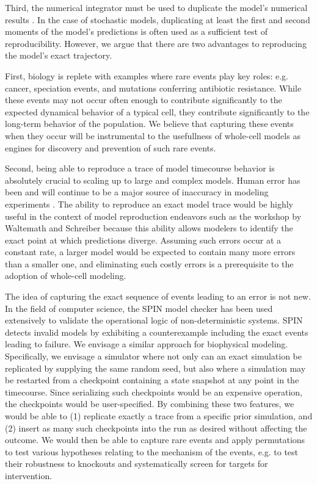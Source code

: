 \documentclass[journal,transmag,twoside]{IEEEtran}
\begin{document}
Third, the numerical integrator must be used to duplicate the model's numerical results \cite{easterbrook2014open}. In the case of stochastic models, duplicating at least the first and second moments of the model's predictions is often used as a sufficient test of reproducibility. However, we argue that there are two advantages to reproducing the model's exact trajectory.

First, biology is replete with examples where rare events play key roles: e.g. cancer, speciation events, and mutations conferring antibiotic resistance. While these events may not occur often enough to contribute significantly to the expected dynamical behavior of a typical cell, they contribute significantly to the long-term behavior of the population. We believe that capturing these events when they occur will be instrumental to the usefullness of whole-cell models as engines for discovery and prevention of such rare events.

Second, being able to reproduce a trace of model timecourse behavior is absolutely crucial to scaling up to large and complex models. Human error has been and will continue to be a major source of inaccuracy in modeling experiments \cite{ebrahim2015genome}. The ability to reproduce an exact model trace would be highly useful in the context of model reproduction endeavors such as the workshop by Waltemath and Schreiber because this ability allows modelers to identify the exact point at which predictions diverge. Assuming such errors occur at a constant rate, a larger model would be expected to contain many more errors than a smaller one, and eliminating such costly errors is a prerequisite to the adoption of whole-cell modeling.

The idea of capturing the exact sequence of events leading to an error is not new. In the field of computer science, the SPIN model checker \cite{holzmann1997model} \cite{holzmann2004spin} has been used extensively to validate the operational logic of non-deterministic systems. SPIN detects invalid models by exhibiting a counterexample including the exact events leading to failure. We envisage a similar approach for biophysical modeling. Specifically, we envisage a simulator where not only can an exact simulation be replicated by supplying the same random seed, but also where a simulation may be restarted from a checkpoint containing a state snapshot at any point in the timecourse. Since serializing such checkpoints would be an expensive operation, the checkpoints would be user-specified. By combining these two features, we would be able to (1) replicate exactly a trace from a specific prior simulation, and (2) insert as many such checkpoints into the run as desired without affecting the outcome. We would then be able to capture rare events and apply permutations to test various hypotheses relating to the mechanism of the events, e.g. to test their robustness to knockouts and systematically screen for targets for intervention.
\end{document}
